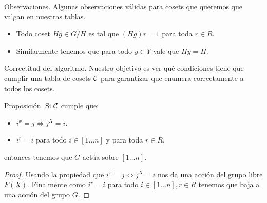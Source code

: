 \documentclass[aspectratio=169, 9pt]{beamer}
\newcommand{\In}{[1 \dots n]}
\newcommand{\Co}{{\cal{C}}}
\begin{document}
\begin{frame}[fragile]{Observaciones.}
	Algunas observaciones válidas para cosets que queremos que valgan en nuestras tablas.
	\begin{itemize}		
		\item Todo coset $Hg \in G/H$ es tal que $(Hg)r = 1$ para toda $r \in R$.
		
		\item Similarmente tenemos que para todo $y \in Y$ vale que $Hy = H$.
	\end{itemize}	
\end{frame}


%	
%	
%	

\begin{frame}[fragile]{Correctitud del algoritmo.}
	Nuestro objetivo es ver qué condiciones tiene que cumplir una tabla de cosets $\Co$ para garantizar que enumera correctamente a todos los cosets.

	\begin{alertblock}{Proposición.}
		Si $\Co$ cumple que:
		\begin{itemize}
			\item  $i^x = j \iff j^{X} = i$.
			\item  $i^r = i$ para todo $i \in \In$ y para toda $r \in R$, 
		\end{itemize}
		entonces tenemos que $G$ actúa sobre $\In$.
	\end{alertblock}
	\medskip
	
	\begin{proof}
		Usando la propiedad que $i^x = j \iff j^{X} = i$ nos da una acción del grupo libre $F(X)$.
		Finalmente como $i^r = i$ para todo $i \in \In, r \in R$ tenemos que baja a una acción del grupo $G$. 
	\end{proof}
\end{frame}
\end{document}
